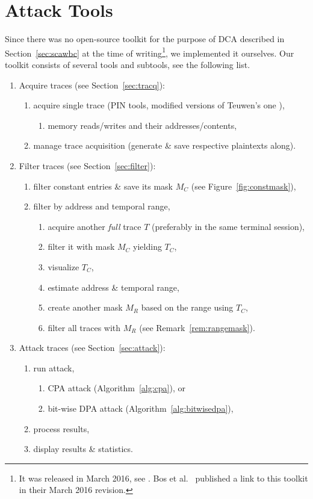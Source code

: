 \section{Attack Tools}
\label{sec:tools}

Since there was no open-source toolkit for the purpose of DCA described in Section~\ref{sec:scawbc} at the time of writing\footnote{It was released in March 2016, see \cite{bos2016tools}. Bos et al.\ \cite{bos2015differential} published a link to this toolkit in their March 2016 revision.}, we implemented it ourselves. Our toolkit consists of several tools and subtools, see the following list.

\begin{enumerate}
	\item Acquire traces (see Section~\ref{sec:tracq}):
	\begin{enumerate}
		\item acquire single trace (PIN tools, modified versions of Teuwen's one \cite{teuwen2015movfuscator}),
		\begin{enumerate}
			\item memory reads/writes and their addresses/contents,
		\end{enumerate}
		\item manage trace acquisition (generate \& save respective plaintexts along).
	\end{enumerate}
	\item Filter traces (see Section~\ref{sec:filter}):
	\begin{enumerate}
		\item filter constant entries \& save its mask $M_C$ (see Figure~\ref{fig:constmask}),
		\item filter by address and temporal range,
		\begin{enumerate}
			\item acquire another {\em full} trace $T$ (preferably in the same terminal session),
			\item filter it with mask $M_C$ yielding $T_C$,
			\item visualize $T_C$,
			\item estimate address \& temporal range,
			\item create another mask $M_R$ based on the range using $T_C$,
			\item filter all traces with $M_R$ (see Remark~\ref{rem:rangemask}).
		\end{enumerate}
	\end{enumerate}
	\item Attack traces (see Section~\ref{sec:attack}):
	\begin{enumerate}
		\item run attack,
		\begin{enumerate}
			\item CPA attack (Algorithm~\ref{alg:cpa}), or
			\item bit-wise DPA attack (Algorithm~\ref{alg:bitwisedpa}),
		\end{enumerate}
		\item process results,
		\item display results \& statistics.
	\end{enumerate}
\end{enumerate}
